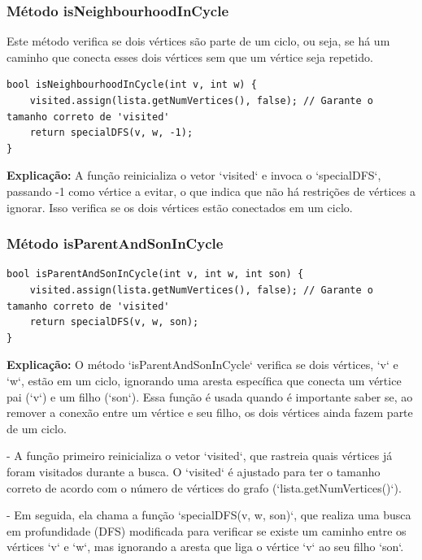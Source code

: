 \documentclass[10pt,conference]{IEEEtran}
\begin{document}
\newpage

\subsubsection{Método isNeighbourhoodInCycle}

Este método verifica se dois vértices são parte de um ciclo, ou seja, se há um caminho que conecta esses dois vértices sem que um vértice seja repetido.

\begin{lstlisting}
bool isNeighbourhoodInCycle(int v, int w) {
    visited.assign(lista.getNumVertices(), false); // Garante o tamanho correto de 'visited'
    return specialDFS(v, w, -1);
}
\end{lstlisting}

\textbf{Explicação:} A função reinicializa o vetor `visited` e invoca o `specialDFS`, passando -1 como vértice a evitar, o que indica que não há restrições de vértices a ignorar. Isso verifica se os dois vértices estão conectados em um ciclo.

\subsubsection{Método isParentAndSonInCycle}

\begin{lstlisting}
bool isParentAndSonInCycle(int v, int w, int son) {
    visited.assign(lista.getNumVertices(), false); // Garante o tamanho correto de 'visited'
    return specialDFS(v, w, son);
}
\end{lstlisting}


\textbf{Explicação:}
O método `isParentAndSonInCycle` verifica se dois vértices, `v` e `w`, estão em um ciclo, ignorando uma aresta específica que conecta um vértice pai (`v`) e um filho (`son`). Essa função é usada quando é importante saber se, ao remover a conexão entre um vértice e seu filho, os dois vértices ainda fazem parte de um ciclo.

- A função primeiro reinicializa o vetor `visited`, que rastreia quais vértices já foram visitados durante a busca. O `visited` é ajustado para ter o tamanho correto de acordo com o número de vértices do grafo (`lista.getNumVertices()`).
  
- Em seguida, ela chama a função `specialDFS(v, w, son)`, que realiza uma busca em profundidade (DFS) modificada para verificar se existe um caminho entre os vértices `v` e `w`, mas ignorando a aresta que liga o vértice `v` ao seu filho `son`.
\end{document}
